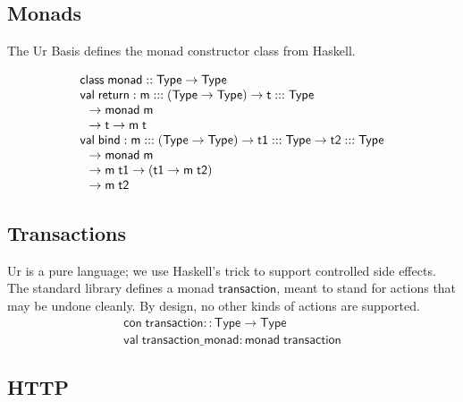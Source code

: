 \documentclass{article}
\newcommand{\mt}[1]{\mathsf{#1}}
\begin{document}
\subsection{Monads}

The Ur Basis defines the monad constructor class from Haskell.

$$\begin{array}{l}
  \mt{class} \; \mt{monad} :: \mt{Type} \to \mt{Type} \\
  \mt{val} \; \mt{return} : \mt{m} ::: (\mt{Type} \to \mt{Type}) \to \mt{t} ::: \mt{Type} \\
  \hspace{.1in} \to \mt{monad} \; \mt{m} \\
  \hspace{.1in} \to \mt{t} \to \mt{m} \; \mt{t} \\
  \mt{val} \; \mt{bind} : \mt{m} ::: (\mt{Type} \to \mt{Type}) \to \mt{t1} ::: \mt{Type} \to \mt{t2} ::: \mt{Type} \\
  \hspace{.1in} \to \mt{monad} \; \mt{m} \\
  \hspace{.1in} \to \mt{m} \; \mt{t1} \to (\mt{t1} \to \mt{m} \; \mt{t2}) \\
  \hspace{.1in} \to \mt{m} \; \mt{t2}
\end{array}$$

\subsection{Transactions}

Ur is a pure language; we use Haskell's trick to support controlled side effects.  The standard library defines a monad $\mt{transaction}$, meant to stand for actions that may be undone cleanly.  By design, no other kinds of actions are supported.
$$\begin{array}{l}
  \mt{con} \; \mt{transaction} :: \mt{Type} \to \mt{Type} \\
  \mt{val} \; \mt{transaction\_monad} : \mt{monad} \; \mt{transaction}
\end{array}$$

\subsection{HTTP}
\end{document}

